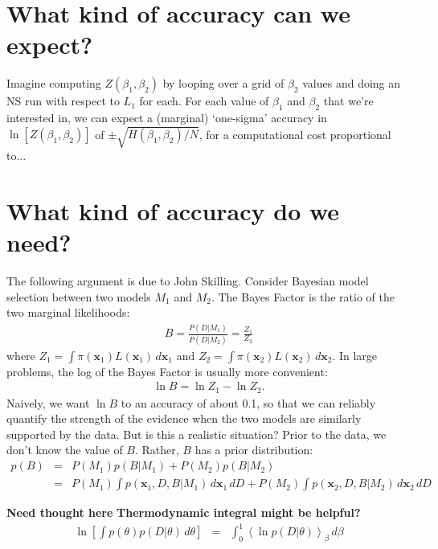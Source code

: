 \documentclass[journal,article,accept,moreauthors,pdftex,12pt,a4paper]{mdpi}
\newcommand{\xx}{\boldsymbol{x}}
\begin{document}
\section{What kind of accuracy can we expect?}

Imagine computing $Z(\beta_1, \beta_2)$ by looping over a grid of $\beta_2$
values and doing an NS run with respect to $L_1$ for each. For each
value of $\beta_1$ and $\beta_2$ that we're interested in, we can expect
a (marginal) `one-sigma' accuracy in
$\ln\left[Z(\beta_1, \beta_2)\right]$ of $\pm \sqrt{H(\beta_1, \beta_2)/N}$,
for a computational cost proportional to...

\section{What kind of accuracy do we need?}

The following argument is due to John Skilling. Consider Bayesian model selection
between two models $M_1$ and $M_2$. The Bayes Factor is the ratio of the
two marginal likelihoods:
\begin{eqnarray}
B = \frac{P(D | M_1)}{P(D | M_2)} = \frac{Z_1}{Z_2}
\end{eqnarray}
where $Z_1 = \int \pi(\xx_1)L(\xx_1) \, d\xx_1$ and
$Z_2 = \int \pi(\xx_2)L(\xx_2) \, d\xx_2$.
In large problems, the log of the Bayes Factor is usually more convenient:
\begin{eqnarray}
\ln B = \ln Z_1 - \ln Z_2.
\end{eqnarray}
Naively, we want $\ln B$ to an accuracy of about 0.1, so that we can reliably
quantify the strength of the evidence when the two models are similarly
supported by the data. But is this a realistic situation?
Prior to the data, we don't know the
value of $B$. Rather, $B$ has a prior distribution:
\begin{eqnarray}
p(B) &=& P(M_1)p(B|M_1) + P(M_2)p(B|M_2)\\
&=& P(M_1)\int p(\xx_1, D, B | M_1)\,d\xx_1\,dD
    + P(M_2)\int p(\xx_2, D, B | M_2)\,d\xx_2\,dD
\end{eqnarray}

{\bf Need thought here}
{\bf Thermodynamic integral might be helpful?}
\begin{eqnarray}
\ln\left[\int p(\theta)p(D|\theta) \, d\theta\right]
&=& \int_0^1 \left<\ln p(D|\theta) \right>_\beta \, d\beta
\end{eqnarray}


\end{document}
